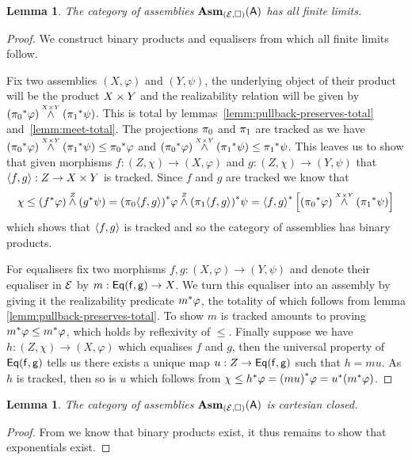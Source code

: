 \documentclass[11pt]{article}
\newtheorem{lemm}[thrm]{Lemma}
\begin{document}
\begin{lemm}\label{lemm:assemblies-finite-limits}
  The category of assemblies \(\AsmCat\) has all finite limits.
\end{lemm}
\begin{proof}
  We construct binary products and equalisers from which all finite limits
  follow.

  Fix two assemblies \((X,\varphi)\) and \((Y,\psi)\), the underlying object of
  their product will be the product \(\IProd{X}{Y}\) and the realizability
  relation will be given by
  \(\TAnd{(\TPull{\IFst}\varphi)}{(\TPull{\ISnd}\psi)}{\IProd{X}{Y}}\).
  This is total by lemmas~\ref{lemm:pullback-preserves-total}
  and~\ref{lemm:meet-total}.
  The projections \(\IFst\) and \(\ISnd\) are tracked as we have
  \(\TAnd{(\TPull{\IFst}\varphi)}{(\TPull{\ISnd}\psi)}{\IProd{X}{Y}} \leq \TPull{\IFst}\varphi\)
  and
  \(\TAnd{(\TPull{\IFst}\varphi)}{(\TPull{\ISnd}\psi)}{\IProd{X}{Y}} \leq \TPull{\ISnd}\psi\).
  This leaves us to show that given morphisms \(f : (Z,\chi) \to (X,\varphi)\)
  and \(g : (Z,\chi) \to (Y,\psi)\) that \(\IPair{f}{g} : Z \to \IProd{X}{Y}\)
  is tracked.
  Since \(f\) and \(g\) are tracked we know that
  \[
    \chi \leq \TAnd{(\TPull{f}\varphi)}{(\TPull{g}\psi)}{Z}
         = \TAnd{\TPull{(\IFst\IPair{f}{g})}\varphi}{\TPull{(\ISnd\IPair{f}{g})}\psi}{Z}
         = \TPull{\IPair{f}{g}}\left[\TAnd{(\TPull{\IFst}\varphi)}{(\TPull{\ISnd}\psi)}{\IProd{X}{Y}}\right]
  \]
  which shows that \(\IPair{f}{g}\) is tracked and so the category of assemblies
  has binary products.

  For equalisers fix two morphisms \(f,g : (X,\varphi) \to (Y,\psi)\) and
  denote their equaliser in \(\E\) by \(m : \IEqualiser{f}{g} \to X\).
  We turn this equaliser into an assembly by giving it the realizability
  predicate \(\TPull{m}\varphi\), the totality of which follows from lemma
  \ref{lemm:pullback-preserves-total}.
  To show \(m\) is tracked amounts to proving
  \(\TPull{m}\varphi \leq \TPull{m}\varphi\), which holds by reflexivity of
  \(\leq\).
  Finally suppose we have \(h : (Z,\chi) \to (X,\varphi)\) which equalises \(f\)
  and \(g\), then the universal property of \(\IEqualiser{f}{g}\) tells us there
  exists a unique map \(u : Z \to \IEqualiser{f}{g}\) such that \(h = mu\).
  As \(h\) is tracked, then so is \(u\) which follows from
  \(\chi\leq\TPull{h}\varphi=\TPull{(mu)}\varphi=\TPull{u}(\TPull{m}\varphi)\).
\end{proof}

\begin{lemm}\label{lemm:assemblies-cartesian-closed}
  The category of assemblies \(\AsmCat\) is cartesian closed.
\end{lemm}
\begin{proof}
  From  we know that binary products exist,
  it thus remains to show that exponentials exist.

\end{proof}
\end{document}

